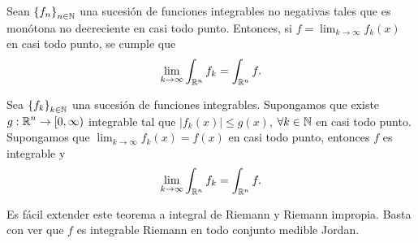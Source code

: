 \begin{theorem}
	Sean $\displaystyle \left\{ f_{n}\right\} _{n\in\mathbb{N}} $ una sucesión de funciones integrables no negativas tales que es monótona no decreciente en casi todo punto. Entonces, si $\displaystyle f = \lim_{k \to \infty}f_{k}\left(x\right) $ en casi todo punto, se cumple que 
	\[\lim_{k \to \infty}\int _{\mathbb{R}^{n}}f_{k} =\int _{\mathbb{R}^{n}}f  .\]
\end{theorem}
\begin{theorem}
	Sea $\displaystyle \left\{ f_{k}\right\} _{k \in \mathbb{N}} $ una sucesión de funciones integrables. Supongamos que existe $\displaystyle g : \mathbb{R}^{n} \to [0,\infty) $ integrable tal que $\displaystyle \left|f_{k}\left(x\right)\right|\leq g\left(x\right) $, $\displaystyle \forall k \in \mathbb{N} $ en casi todo punto. Supongamos que $\displaystyle \lim_{k \to \infty}f_{k}\left(x\right)=f\left(x\right) $ en casi todo punto, entonces $\displaystyle f $ es integrable y
	\[\lim_{k \to \infty}\int _{\mathbb{R}^{n}}f_{k} =\int _{\mathbb{R}^{n}}f .\]
\end{theorem}
\begin{observation}
Es fácil extender este teorema a integral de Riemann y Riemann impropia. Basta con ver que $\displaystyle f $ es integrable Riemann en todo conjunto medible Jordan. 
\end{observation}

